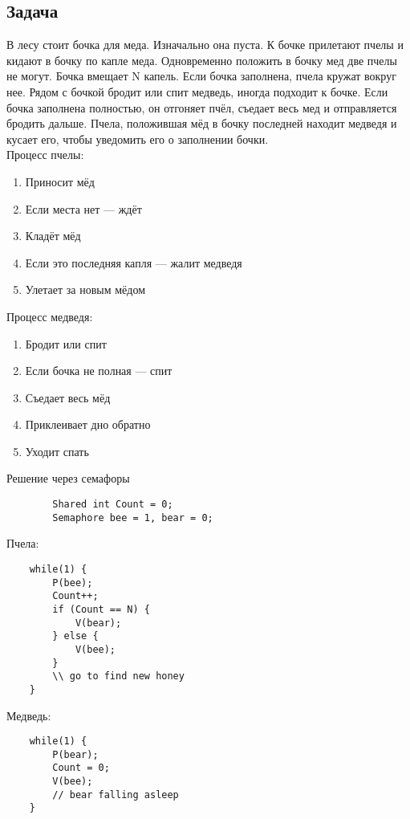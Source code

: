 \documentclass[12pt, a4paper]{article}
\begin{document}
    \subsection*{Задача}
    В лесу стоит бочка для меда. Изначально она пуста. К бочке прилетают пчелы и кидают в бочку по капле меда. Одновременно положить в бочку мед две пчелы не могут. Бочка вмещает N капель. Если бочка заполнена, пчела кружат вокруг нее. Рядом с бочкой бродит или спит медведь, иногда подходит к бочке. Если бочка заполнена полностью, он отгоняет пчёл, съедает весь мед и отправляется бродить дальше. Пчела, положившая мёд в бочку последней находит медведя и кусает его, чтобы уведомить его о заполнении бочки.\\
    Процесс пчелы:
    \begin{enumerate}
        \item Приносит мёд
        \item Если места нет --- ждёт
        \item Кладёт мёд
        \item Если это последняя капля --- жалит медведя
        \item Улетает за новым мёдом
    \end{enumerate}
    Процесс медведя:
    \begin{enumerate}
        \item Бродит или спит
        \item Если бочка не полная --- спит
        \item Съедает весь мёд
        \item Приклеивает дно обратно
        \item Уходит спать
    \end{enumerate}
    \begin{center}
        Решение через семафоры
    \end{center}
    \begin{lstlisting}
        Shared int Count = 0;
        Semaphore bee = 1, bear = 0;
    \end{lstlisting}
    Пчела:
    \begin{lstlisting}
    while(1) {
        P(bee);
        Count++;
        if (Count == N) {
            V(bear);
        } else {
            V(bee);
        }
        \\ go to find new honey
    }
    \end{lstlisting}
    Медведь:
    \begin{lstlisting}
    while(1) {
        P(bear);
        Count = 0;
        V(bee);
        // bear falling asleep
    }
    \end{lstlisting}
\end{document}
